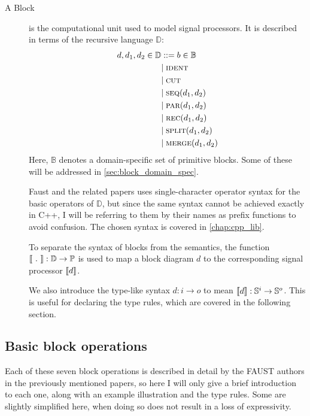 \begin{description}
  \item[A Block] is the computational unit used to model signal processors. It is described in terms of the
        recursive language $\mathbb D$:
        \begin{align*}
          d, d_1, d_2 \in \mathbb{D} & ::= b \in \mathbb{B}      \\
                                     & |\; \textsc{ident}                \\
                                     & |\; \textsc{cut}                  \\
                                     & |\; \textsc{seq}(d_1, d_2) \\
                                     & |\; \textsc{par}(d_1, d_2)   \\
                                     & |\; \textsc{rec}(d_1, d_2)  \\
                                     & |\; \textsc{split}(d_1, d_2)      \\
                                     & |\; \textsc{merge}(d_1, d_2)      \\
        \end{align*}
        Here, $\mathbb B$ denotes a domain-specific set of primitive blocks. Some of these will be
        addressed in \autoref{sec:block_domain_spec}.

        Faust and the related papers\autocite{orlarey2002,orlarey2004} uses single-character operator syntax for the basic
        operators of $\mathbb D$, but since the same syntax cannot be achieved exactly in C++, I will be
        referring to them by their names as prefix functions to avoid confusion. The chosen syntax is covered in
        \autoref{chap:cpp_lib}.

        To separate the syntax of blocks from the semantics, the function $\llbracket \ .\  \rrbracket : \mathbb D
          \rightarrow \mathbb P$ is used to map a
        block diagram $d$ to the corresponding signal processor $\llbracket d \rrbracket$.

        We also introduce the type-like syntax $d : i \rightarrow o$ to mean $\llbracket d \rrbracket : \mathbb{S}^i \rightarrow \mathbb{S}^o$. This is useful
        for declaring the type rules, which are covered in the following section.
\end{description}

\subsection{Basic block operations}
Each of these seven block operations is described in detail by the FAUST authors in the previously mentioned
papers\autocite{orlarey2002,orlarey2004}, so here I will only give a brief introduction to each one, along with an
example illustration and the type rules. Some are slightly simplified here, when doing so does not result in
a loss of expressivity.

